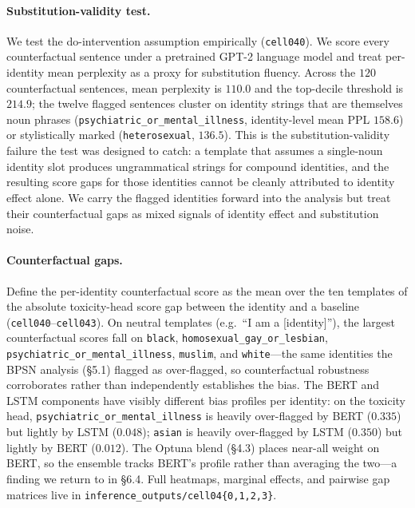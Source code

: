 \documentclass[11pt]{article}
\begin{document}
\paragraph{Substitution-validity test.} We test the do-intervention assumption empirically (\texttt{cell040}). We score every counterfactual sentence under a pretrained GPT-2 language model and treat per-identity mean perplexity as a proxy for substitution fluency. Across the $120$ counterfactual sentences, mean perplexity is $110.0$ and the top-decile threshold is $214.9$; the twelve flagged sentences cluster on identity strings that are themselves noun phrases (\texttt{psychiatric\_or\_mental\_illness}, identity-level mean PPL $158.6$) or stylistically marked (\texttt{heterosexual}, $136.5$). This is the substitution-validity failure the test was designed to catch: a template that assumes a single-noun identity slot produces ungrammatical strings for compound identities, and the resulting score gaps for those identities cannot be cleanly attributed to identity effect alone. We carry the flagged identities forward into the analysis but treat their counterfactual gaps as mixed signals of identity effect and substitution noise.

\paragraph{Counterfactual gaps.} Define the per-identity counterfactual score as the mean over the ten templates of the absolute toxicity-head score gap between the identity and a baseline (\texttt{cell040}--\texttt{cell043}). On neutral templates (e.g.\ ``I am a [identity]''), the largest counterfactual scores fall on \texttt{black}, \texttt{homosexual\_gay\_or\_lesbian}, \texttt{psychiatric\_or\_mental\_illness}, \texttt{muslim}, and \texttt{white}---the same identities the BPSN analysis (\S5.1) flagged as over-flagged, so counterfactual robustness corroborates rather than independently establishes the bias. The BERT and LSTM components have visibly different bias profiles per identity: on the toxicity head, \texttt{psychiatric\_or\_mental\_illness} is heavily over-flagged by BERT ($0.335$) but lightly by LSTM ($0.048$); \texttt{asian} is heavily over-flagged by LSTM ($0.350$) but lightly by BERT ($0.012$). The Optuna blend (\S4.3) places near-all weight on BERT, so the ensemble tracks BERT's profile rather than averaging the two---a finding we return to in \S6.4. Full heatmaps, marginal effects, and pairwise gap matrices live in \texttt{inference\_outputs/cell04\{0,1,2,3\}}.
\end{document}
